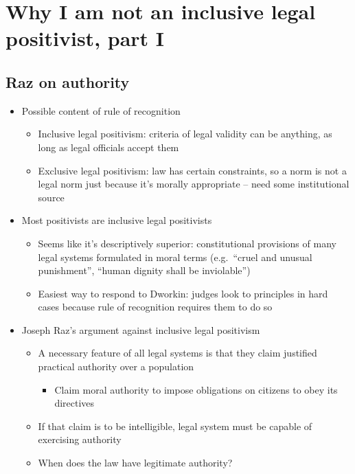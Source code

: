 \hypertarget{why-i-am-not-an-inclusive-legal-positivist-part-i}{%
\section{Why I am not an inclusive legal positivist, part
I}\label{why-i-am-not-an-inclusive-legal-positivist-part-i}}

\hypertarget{raz-on-authority}{%
\subsection{Raz on authority}\label{raz-on-authority}}

\begin{itemize}
\tightlist
\item
  Possible content of rule of recognition

  \begin{itemize}
  \tightlist
  \item
    Inclusive legal positivism: criteria of legal validity can be
    anything, as long as legal officials accept them
  \item
    Exclusive legal positivism: law has certain constraints, so a norm
    is not a legal norm just because it's morally appropriate -- need
    some institutional source
  \end{itemize}
\item
  Most positivists are inclusive legal positivists

  \begin{itemize}
  \tightlist
  \item
    Seems like it's descriptively superior: constitutional provisions of
    many legal systems formulated in moral terms (e.g.~``cruel and
    unusual punishment'', ``human dignity shall be inviolable'')
  \item
    Easiest way to respond to Dworkin: judges look to principles in hard
    cases because rule of recognition requires them to do so
  \end{itemize}
\item
  Joseph Raz's argument against inclusive legal positivism

  \begin{itemize}
  \tightlist
  \item
    A necessary feature of all legal systems is that they claim
    justified practical authority over a population

    \begin{itemize}
    \tightlist
    \item
      Claim moral authority to impose obligations on citizens to obey
      its directives
    \end{itemize}
  \item
    If that claim is to be intelligible, legal system must be capable of
    exercising authority
  \item
    When does the law have legitimate authority?


\end{itemize}
\end{itemize}
